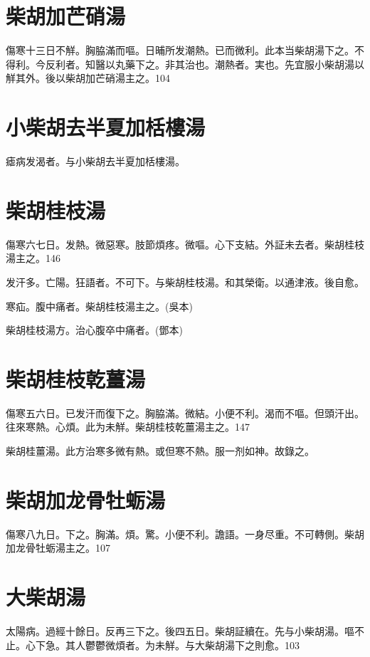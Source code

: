 \documentclass[12pt,twoside,UTF8,b5paper]{ctexbook}
\begin{document}
\section{柴胡加芒硝湯}

傷寒十三日不觧。胸脇滿而嘔。日晡所发潮熱{。已}而微利。此本当柴胡湯下之。不得利。今反利者。知醫以丸藥下之。非其治也。潮熱者。実也。先宜服小柴胡湯以觧其外。後以柴胡加芒硝湯主之。104

\section{小柴胡去半夏加栝樓湯}

瘧病发渴者。与小柴胡去半夏加栝樓湯。

\section{柴胡桂枝湯}

傷寒六七日。发熱。微惡寒。肢節煩疼。微嘔。心下支結。外証未去者。柴胡桂枝湯主之。146

发汗多。亡陽。狂語者。不可下。与柴胡桂枝湯。和其榮衛。以通津液。後自愈。

寒疝。腹中痛者。柴胡桂枝湯主之。(吳本)

柴胡桂枝湯方。治心腹卒中痛者。(鄧本)

\section{柴胡桂枝乾薑湯}

傷寒五六日。已发汗而復下之。胸脇滿。微結。小便不利。渴而不嘔。但頭汗出。往來寒熱。心煩。此为未觧。柴胡桂枝乾薑湯主之。147

柴胡桂薑湯。此方治寒多微有熱。或但寒不熱。服一剂如神。故錄之。

\section{柴胡加龙骨牡蛎湯}

傷寒八九日。下之。胸滿。煩。驚。小便不利。譫語。一身尽重。不可轉側。柴胡加龙骨牡蛎湯主之。107

\section{大柴胡湯}

太陽病。過經十餘日。反再三下之。後四五日。柴胡証續在。先与小柴胡湯。嘔不止。心下急。其人鬱鬱微煩者。为未觧。与大柴胡湯下之則愈。103
\end{document}
